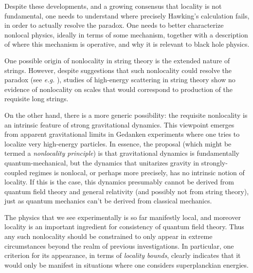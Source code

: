 Despite these developments, and a growing consensus that locality is not fundamental, one needs  to understand   where precisely Hawking's calculation fails, in order to actually resolve the paradox.  One needs to better characterize nonlocal physics, ideally in terms of some mechanism, together with a description of where this mechanism is operative, and why it is relevant to black hole physics.  

One possible origin of nonlocality in string theory is the extended nature of strings.  However, despite suggestions that such nonlocality could resolve the paradox (see {\it e.g.} \LPSTU), studies of high-energy scattering in string theory show no evidence of nonlocality on scales that would correspond to production of the requisite long strings\SGloc.  

On the other hand, there is a more generic possibility:  the requisite nonlocality is an intrinsic feature of strong gravitational dynamics.  This viewpoint emerges from apparent gravitational limits in Gedanken experiments where one tries to localize very high-energy particles.  In essence, the  proposal (which might be termed a {\it nonlocality principle}) is that gravitational dynamics is fundamentally quantum-mechanical, but the dynamics that unitarizes gravity in strongly-coupled regimes is nonlocal, or perhaps more precisely, has no intrinsic notion of locality.  If this is the case, this dynamics presumably cannot be derived from quantum field theory and general relativity (and possibly not from string theory), just as quantum mechanics can't be derived from classical mechanics.  

The physics that we see experimentally is so far manifestly local, and moreover locality is an important ingredient for consistency of quantum field theory.  Thus any such nonlocality should be constrained to only appear in extreme circumstances beyond the realm of previous investigations.  In particular, one criterion for its appearance, in terms of {\it locality bounds}, clearly indicates that it would only be manifest in situations where one considers superplanckian energies.

